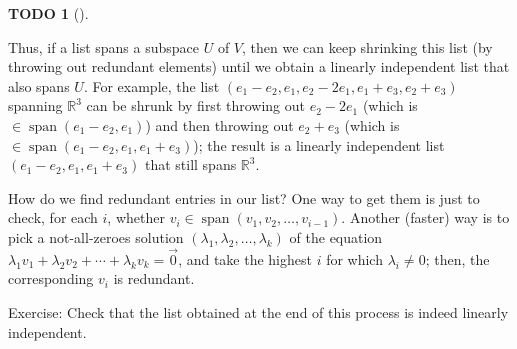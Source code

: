 \documentclass[numbers=enddot,12pt,final,onecolumn,notitlepage]{scrartcl}%
\theoremstyle{definition}
\newtheorem{quest}[theo]{TODO}
\newenvironment{todo}[1][]
{\begin{quest}[#1]\begin{leftbar}}
{\end{leftbar}\end{quest}}
\begin{document}
\begin{todo}
Thus, if a list spans a subspace $U$ of $V$, then we can keep shrinking this
list (by throwing out redundant elements) until we obtain a linearly
independent list that also spans $U$. For example, the list $\left(
e_{1}-e_{2},e_{1},e_{2}-2e_{1},e_{1}+e_{3},e_{2}+e_{3}\right)  $ spanning
$\mathbb{R}^{3}$ can be shrunk by first throwing out $e_{2}-2e_{1}$ (which is
$\in\operatorname*{span}\left(  e_{1}-e_{2},e_{1}\right)  $) and then throwing
out $e_{2}+e_{3}$ (which is $\in\operatorname*{span}\left(  e_{1}-e_{2}%
,e_{1},e_{1}+e_{3}\right)  $); the result is a linearly independent list
$\left(  e_{1}-e_{2},e_{1},e_{1}+e_{3}\right)  $ that still spans
$\mathbb{R}^{3}$.

How do we find redundant entries in our list? One way to get them is just to
check, for each $i$, whether $v_{i}\in\operatorname*{span}\left(  v_{1}%
,v_{2},\ldots,v_{i-1}\right)  $. Another (faster) way is to pick a
not-all-zeroes solution $\left(  \lambda_{1},\lambda_{2},\ldots,\lambda
_{k}\right)  $ of the equation $\lambda_{1}v_{1}+\lambda_{2}v_{2}%
+\cdots+\lambda_{k}v_{k}=\overrightarrow{0}$, and take the highest $i$ for
which $\lambda_{i}\neq0$; then, the corresponding $v_{i}$ is redundant.

Exercise: Check that the list obtained at the end of this process is indeed
linearly independent.
\end{todo}
\end{document}
